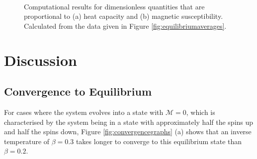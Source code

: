 \documentclass[11pt]{iopart}
\begin{document}
\begin{figure}[t]
    \centering
    \quad
     \
 
    \caption{Computational results for dimensionless quantities that are proportional to (a) heat capacity and (b) magnetic susceptibility. Calculated from the data given in Figure \ref{fig:equilibriumaverages}.}
    \label{fig:derivedproperties}
\end{figure}

\section{Discussion}
\subsection{Convergence to Equilibrium}
For cases where the system evolves into a state with $\mathcal{M} = 0$, which is characterised by the system being in a state with approximately half the spins up and half the spins down, Figure \ref{fig:convergencegraphs} (a) shows that an inverse temperature of $\beta = 0.3$ takes longer to converge to this equilibrium state than $\beta = 0.2$.
\end{document}
